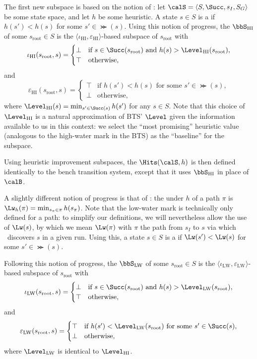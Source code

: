 The first new subspace is based on the notion of : let $\calS=\langle S,\Succ,s_I,S_G\rangle$ be some state space, and let $h$ be some heuristic. A state $s\in S$ is a  if $h(s')<h(s)$ for some $s'\in\Succ(s)$. Using this notion of progress, the  $\bbS_\text{HI}$ of some $s_\text{root}\in S$ is the $\langle\iota_\text{HI},\varepsilon_\text{HI}\rangle$-based subspace of $s_\text{root}$ with $$\iota_\text{HI}(s_\text{root},s)=\begin{cases}\bot&\text{if }s\in\Succ(s_\text{root})\text{ and }h(s)>\Level_\text{HI}(s_\text{root}),\\\top&\text{otherwise,}\end{cases}$$ and $$\varepsilon_\text{HI}(s_\text{root},s)=\begin{cases}\top&\text{if }h(s')<h(s)\text{ for some }s'\in\Succ(s),\\\bot&\text{otherwise,}\end{cases}$$ where $\Level_\text{HI}(s)=\min_{s'\in\Succ(s)}h(s')$ for any $s\in S$. Note that this choice of $\Level_\text{HI}$ is a natural approximation of BTS' $\Level$ given the information available to us in this context: we select the ``most promising'' heuristic value (analogous to the high-water mark in the BTS) as the ``baseline'' for the subspace.

Using heuristic improvement subspaces, the  $\Hits(\calS,h)$ is then defined identically to the bench transition system, except that it uses $\bbS_\text{HI}$ in place of $\calB$.

A slightly different notion of progress is that of : the  under $h$ of a path $\pi$ is $\Lw_h(\pi)=\min_{s_\pi\in\pi}h(s_\pi)$. Note that the low-water mark is technically only defined for a path: to simplify our definitions, we will nevertheless allow the use of $\Lw(s)$, by which we mean $\Lw(\pi)$ with $\pi$ the path from $s_I$ to $s$ via which \gbfs\ discovers $s$ in a given run. Using this, a state $s\in S$ is a  if $\Lw(s')<\Lw(s)$ for some $s'\in\Succ(s)$.

Following this notion of progress, the  $\bbS_\text{LW}$ of some $s_\text{root}\in S$ is the $\langle\iota_\text{LW},\varepsilon_\text{LW}\rangle$-based subspace of $s_\text{root}$ with $$\iota_\text{LW}(s_\text{root},s)=\begin{cases}\bot&\text{if }s\in\Succ(s_\text{root})\text{ and }h(s)>\Level_\text{LW}(s_\text{root}),\\\top&\text{otherwise,}\end{cases}$$ and $$\varepsilon_\text{LW}(s_\text{root},s)=\begin{cases}\top&\text{if }h(s')<\Level_\text{LW}(s_\text{root})\text{ for some }s'\in\Succ(s),\\\bot&\text{otherwise,}\end{cases}$$ where $\Level_\text{LW}$ is identical to $\Level_\text{HI}$.

